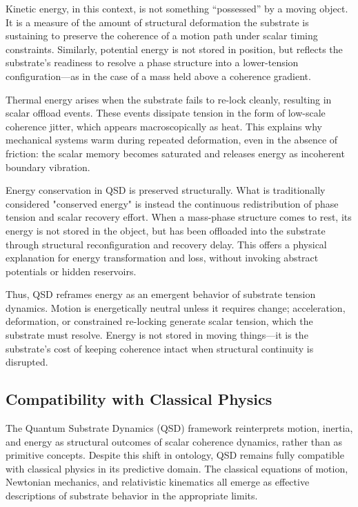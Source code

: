 \documentclass[entropy,article,submit,pdftex,moreauthors]{Definitions/mdpi}
\begin{document}
Kinetic energy, in this context, is not something “possessed” by a moving object. It is a measure of the amount of structural deformation the substrate is sustaining to preserve the coherence of a motion path under scalar timing constraints. Similarly, potential energy is not stored in position, but reflects the substrate's readiness to resolve a phase structure into a lower-tension configuration---as in the case of a mass held above a coherence gradient.

Thermal energy arises when the substrate fails to re-lock cleanly, resulting in scalar offload events. These events dissipate tension in the form of low-scale coherence jitter, which appears macroscopically as heat. This explains why mechanical systems warm during repeated deformation, even in the absence of friction: the scalar memory becomes saturated and releases energy as incoherent boundary vibration.

Energy conservation in QSD is preserved structurally. What is traditionally considered "conserved energy" is instead the continuous redistribution of phase tension and scalar recovery effort. When a mass-phase structure comes to rest, its energy is not stored in the object, but has been offloaded into the substrate through structural reconfiguration and recovery delay. This offers a physical explanation for energy transformation and loss, without invoking abstract potentials or hidden reservoirs.

Thus, QSD reframes energy as an emergent behavior of substrate tension dynamics. Motion is energetically neutral unless it requires change; acceleration, deformation, or constrained re-locking generate scalar tension, which the substrate must resolve. Energy is not stored in moving things---it is the substrate’s cost of keeping coherence intact when structural continuity is disrupted.

\subsection{Compatibility with Classical Physics}

The Quantum Substrate Dynamics (QSD) framework reinterprets motion, inertia, and energy as structural outcomes of scalar coherence dynamics, rather than as primitive concepts. Despite this shift in ontology, QSD remains fully compatible with classical physics in its predictive domain. The classical equations of motion, Newtonian mechanics, and relativistic kinematics all emerge as effective descriptions of substrate behavior in the appropriate limits.
\end{document}

